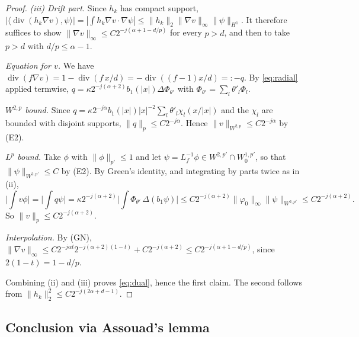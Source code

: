 \documentclass[11pt]{article}
\theoremstyle{definition}
\theoremstyle{remark}
\newcommand{\dv}{\operatorname{div}}
\begin{document}
\begin{proof}
\emph{(iii) Drift part.} Since $h_k$ has compact support,
$|\langle\dv(h_k\nabla v),\psi\rangle|=|\int h_k\nabla v\cdot\nabla\psi|\le\|h_k\|_2\|\nabla v\|_\infty\|\psi\|_{H^1}$.
It therefore suffices to show $\|\nabla v\|_\infty\le C2^{-j(\alpha+1-d/p)}$ for every $p>d$, and then to take $p>d$ with $d/p\le\alpha-1$.

\emph{Equation for $v$.} We have $\dv(f\nabla v)=1-\dv(f\,x/d)=-\dv((f-1)x/d)=:-q$. By \eqref{eq:radial} applied termwise,
$q=\kappa2^{-j(\alpha+2)}b_1(|x|)\Delta\Phi_{\theta'}$ with $\Phi_{\theta'}=\sum_l\theta'_l\Phi_l$.

\emph{$W^{2,p}$ bound.} Since $q=\kappa2^{-j\alpha}b_1(|x|)|x|^{-2}\sum_l\theta'_l\chi_l(x/|x|)$ and the $\chi_l$ are bounded with disjoint supports, $\|q\|_p\le C2^{-j\alpha}$. Hence $\|v\|_{W^{2,p}}\le C2^{-j\alpha}$ by (E2).

\emph{$L^p$ bound.} Take $\phi$ with $\|\phi\|_{p'}\le1$ and let $\psi=L_f^{-1}\phi\in W^{2,p'}\cap W^{1,p'}_0$, so that $\|\psi\|_{W^{2,p'}}\le C$ by (E2). By Green's identity, and integrating by parts twice as in (ii),
\[
\Big|\int v\phi\Big|=\Big|\int q\psi\Big|=\kappa2^{-j(\alpha+2)}\Big|\int\Phi_{\theta'}\,\Delta(b_1\psi)\Big|\le C2^{-j(\alpha+2)}\|\varphi_0\|_\infty\|\psi\|_{W^{2,p'}}\le C2^{-j(\alpha+2)} .
\]
So $\|v\|_p\le C2^{-j(\alpha+2)}$.

\emph{Interpolation.} By (GN),
$\|\nabla v\|_\infty\le C2^{-j\alpha t}2^{-j(\alpha+2)(1-t)}+C2^{-j(\alpha+2)}\le C2^{-j(\alpha+1-d/p)}$, since $2(1-t)=1-d/p$.

Combining (ii) and (iii) proves \eqref{eq:dual}, hence the first claim. The second follows from $\|h_k\|_2^2\le C2^{-j(2\alpha+d-1)}$.
\end{proof}

\subsection{Conclusion via Assouad's lemma}
\end{document}
